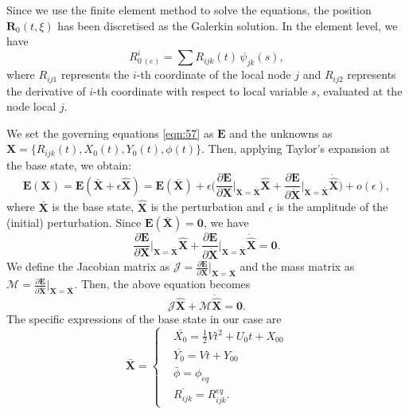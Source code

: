 \documentclass[a4paper,12pt]{article}
\begin{document}
Since we use the finite element method to solve the equations, the position $\textbf{R}_0(t,\xi)$ has been discretised as the Galerkin solution. In the element level, we have
\begin{equation}
	\label{eqn:108}
R_{0\,(e)}^i=\sum R_{ijk}(t)\, \psi_{jk}(s),
\end{equation}
where $R_{ij1}$ represents the $i$-th coordinate of the local node $j$ and $R_{ij2}$ represents the derivative of $i$-th coordinate with respect to local variable $s$, evaluated at the node local $j$.

We set the governing equations \eqref{eqn:57} as $\bm{E}$ and the unknowns as $\bm{X}=\{R_{ijk}(t),X_0(t), Y_0(t),\phi(t)\}$. Then, applying Taylor's expansion at the base state, we obtain:
\begin{equation}
	\label{eqn:109}
\bm{E}(\bm{X})=\bm{E}(\bar{\bm{X}}+\epsilon \hat{\bm{X}})=\bm{E}(\bar{\bm{X}})+\epsilon \Big(\frac{\partial \bm{E}}{\partial \bm{X}}\Big|_{\bm{X}=\bar{\bm{X}}}\hat{\bm{X}}+\frac{\partial \bm{E}}{\partial \dot{\bm{X}}}\Big|_{\bm{X}=\bar{\bm{X}}}\dot{\hat{\bm{X}}}\Big)+o(\epsilon),
\end{equation}
where $\bar{\bm{X}}$ is the base state, $\hat{\bm{X}}$ is the perturbation and $\epsilon$ is the amplitude of the (initial) perturbation. Since $\bm{E}(\bar{\bm{X}})=\bm{0}$, we have 
\begin{equation}
	\label{eqn:110}
	\frac{\partial \bm{E}}{\partial \bm{X}}\Big|_{\bm{X}=\bar{\bm{X}}}\hat{\bm{X}}+\frac{\partial \bm{E}}{\partial \dot{\bm{X}}}\Big|_{\bm{X}=\bar{\bm{X}}}\dot{\hat{\bm{X}}}=\bm{0}.
\end{equation}
We define the Jacobian matrix as $\bm{\mathcal{J}}=\frac{\partial \bm{E}}{\partial \bm{X}}\Big|_{\bm{X}=\bar{\bm{X}}}$ and the mass matrix as $\bm{\mathcal{M}}=\frac{\partial \bm{E}}{\partial \dot{\bm{X}}}\Big|_{\bm{X}=\bar{\bm{X}}}$. Then, the above equation becomes 
\begin{equation}
	\label{eqn:111}
\bm{\mathcal{J}}\hat{\bm{X}}+\bm{\mathcal{M}}\dot{\hat{\bm{X}}}=\bm{0}.
\end{equation}
The specific expressions of the base state in our case are 
\begin{equation}
	\label{eqn:112}
	\bar{\bm{X}}=\left\{\begin{aligned}
		&\bar{X_0}=\frac{1}{2}Vt^2+U_0t+X_{00} \\
		&\bar{Y_0}=Vt+Y_{00} \\
		&\bar{\phi}=\phi_{eq} \\
		&\overline{R_{ijk}}=R_{ijk}^{eq}.
	\end{aligned}\right.	
\end{equation}
\end{document}
